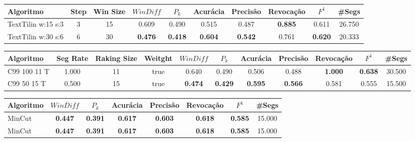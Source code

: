\documentclass{article}
\begin{document}
 

\begin{longtable}[c]{|l|c|c|c|c|c|c|c|c|c|} 
\hline 
Algoritmo & Step & Win Size & $WinDiff$ & $P_k$ & Acurácia & Precisão & Revocação & $F^1$ & \#Segs\\ \hline 
TextTilin w:15 s:3 & 3 & 15 & 0.609 & 0.490 & 0.515 & 0.487 & \cellcolor{gray!20} \textbf{0.885} & 0.611 & 26.750  \\ \hline 
 TextTilin w:30 s:6 & 6 & 30 & \cellcolor{gray!20} \textbf{0.476} & \cellcolor{gray!20} \textbf{0.418} & \cellcolor{gray!20} \textbf{0.604} & \cellcolor{gray!20} \textbf{0.542} & 0.761 & \cellcolor{gray!20} \textbf{0.620} & 20.333  \\ \hline 
 \end{longtable} 


\begin{longtable}[c]{|l|c|c|c|c|c|c|c|c|c|c|} 
\hline 
Algoritmo & Seg Rate & Raking Size & Weitght & $WinDiff$ & $P_k$ & Acurácia & Precisão & Revocação & $F^1$ & \#Segs\\ \hline 
C99 100 11 T & 1.000 & 11 & true & 0.640 & 0.490 & 0.506 & 0.488 & \cellcolor{gray!20} \textbf{1.000} & \cellcolor{gray!20} \textbf{0.638} & 30.500  \\ \hline 
 C99 50 15 T & 0.500 & 15 & true & \cellcolor{gray!20} \textbf{0.474} & \cellcolor{gray!20} \textbf{0.429} & \cellcolor{gray!20} \textbf{0.595} & \cellcolor{gray!20} \textbf{0.566} & 0.581 & 0.555 & 15.500  \\ \hline 
 \end{longtable} 


\begin{longtable}[c]{|l|c|c|c|c|c|c|c|} 
\hline 
Algoritmo & $WinDiff$ & $P_k$ & Acurácia & Precisão & Revocação & $F^1$ & \#Segs\\ \hline 
MinCut & \cellcolor{gray!20} \textbf{0.447} & \cellcolor{gray!20} \textbf{0.391} & \cellcolor{gray!20} \textbf{0.617} & \cellcolor{gray!20} \textbf{0.603} & \cellcolor{gray!20} \textbf{0.618} & \cellcolor{gray!20} \textbf{0.585} & 15.000  \\ \hline 
 MinCut & \cellcolor{gray!20} \textbf{0.447} & \cellcolor{gray!20} \textbf{0.391} & \cellcolor{gray!20} \textbf{0.617} & \cellcolor{gray!20} \textbf{0.603} & \cellcolor{gray!20} \textbf{0.618} & \cellcolor{gray!20} \textbf{0.585} & 15.000  \\ \hline 
 \end{longtable} 
\end{document}
